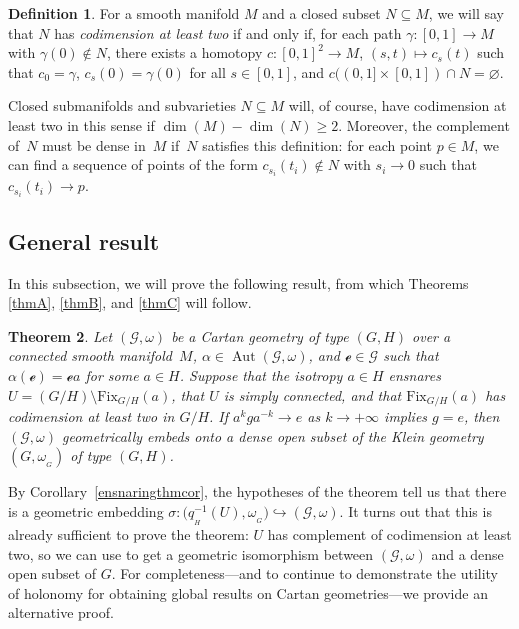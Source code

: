 \documentclass[10pt,a4paper]{amsart}
\numberwithin{equation}{section}
\newtheorem{Theorem}{Theorem}[section]
\theoremstyle{definition}
\newtheorem{Definition}[Theorem]{Definition}
\DeclareMathOperator{\Aut}{\mathrm{Aut}}
\newcommand{\MC}[1]{\omega_{{}_{#1}}}
\begin{document}
\begin{Definition}For a smooth manifold $M$ and a closed subset $N\subseteq M$, we will say that $N$ has \emph{codimension at least two} if and only if, for each path $\gamma \colon [0,1]\to M$ with $\gamma(0)\not\in N$, there exists a homotopy $c\colon [0,1]^2\to M$, $(s,t)\mapsto c_s(t)$ such that $c_0=\gamma$, $c_s(0)=\gamma(0)$ for all $s\in[0,1]$, and $c((0,1]\times[0,1])\cap N=\varnothing$.\end{Definition}

Closed submanifolds and subvarieties $N\subseteq M$ will, of course, have codimension at least two in this sense if $\dim(M)-\dim(N)\geq 2$. Moreover, the complement of~$N$ must be dense in~$M$ if~$N$ satisfies this definition: for each point $p\in M$, we can find a sequence of points of the form $c_{s_i}(t_i)\not\in N$ with $s_i\rightarrow 0$ such that $c_{s_i}(t_i)\rightarrow p$.

\subsection{General result}
In this subsection, we will prove the following result, from which Theorems \ref{thmA}, \ref{thmB}, and \ref{thmC} will follow.

\begin{Theorem}\label{ensnaringthm+} Let $(\mathscr{G},\omega)$ be a Cartan geometry of type $(G,H)$ over a connected smooth mani\-fold~$M$, $\alpha\in\Aut(\mathscr{G},\omega)$, and $\mathscr{e}\in\mathscr{G}$ such that $\alpha(\mathscr{e})=\mathscr{e}a$ for some $a\in H$. Suppose that the isotropy $a\in H$ ensnares $U=(G/H)\setminus\mathrm{Fix}_{G/H}(a)$, that $U$ is simply connected, and that $\mathrm{Fix}_{G/H}(a)$ has codimension at least two in $G/H$. If $a^kga^{-k}\rightarrow e$ as $k\rightarrow +\infty$ implies $g=e$, then $(\mathscr{G},\omega)$ geometrically embeds onto a dense open subset of the Klein geometry $(G,\MC{G})$ of type $(G,H)$.\end{Theorem}

By Corollary~\ref{ensnaringthmcor}, the hypotheses of the theorem tell us that there is a geometric embedding $\sigma\colon \bigl(q_{{}_H}^{-1}(U),\MC{G}\bigr)\hookrightarrow (\mathscr{G},\omega)$. It turns out that this is already sufficient to prove the theorem: $U$ has complement of codimension at least two, so we can use \cite[Theorem~1.8]{Frances2008} to get a geometric isomorphism between $(\mathscr{G},\omega)$ and a dense open subset of $G$. For completeness---and to continue to demonstrate the utility of holonomy for obtaining global results on Cartan geometries---we provide an alternative proof.
\end{document}
